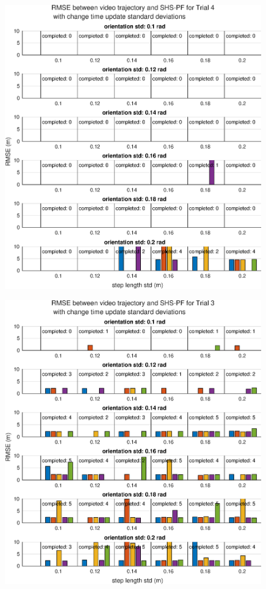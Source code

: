 \begin{figure}[H]
	\centering
	\includegraphics[width=0.6\linewidth]{images/20201201_0951_RMSE_between_video_trajectory_and_SHS-PF_for_Trial_4_1}
		\setlength{\belowcaptionskip}{-20pt}
	\caption{}
	\label{fig:202012010951rmsebetweenvideotrajectoryandshs-pffortrial41}
\end{figure}
\begin{figure}[H]
	\centering
	\includegraphics[width=0.6\linewidth]{images/20201201_0951_RMSE_between_video_trajectory_and_SHS-PF_for_Trial_3_1}
		\setlength{\belowcaptionskip}{-20pt}
	\caption{}
	\label{fig:202012010951rmsebetweenvideotrajectoryandshs-pffortrial31}
\end{figure}
